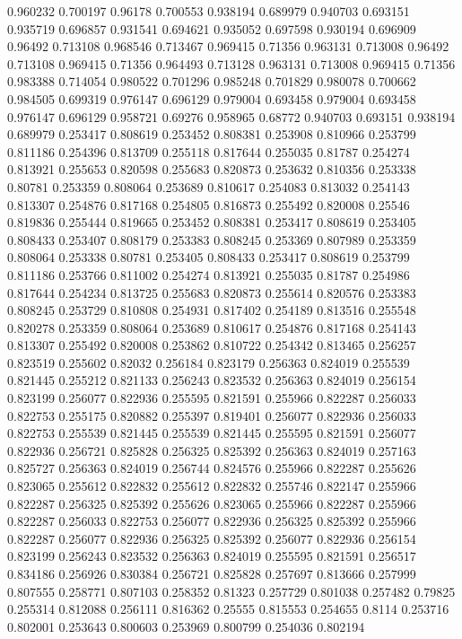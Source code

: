 0.960232 0.700197
0.96178 0.700553
0.938194 0.689979
0.940703 0.693151
0.935719 0.696857
0.931541 0.694621
0.935052 0.697598
0.930194 0.696909
0.96492 0.713108
0.968546 0.713467
0.969415 0.71356
0.963131 0.713008
0.96492 0.713108
0.969415 0.71356
0.964493 0.713128
0.963131 0.713008
0.969415 0.71356
0.983388 0.714054
0.980522 0.701296
0.985248 0.701829
0.980078 0.700662
0.984505 0.699319
0.976147 0.696129
0.979004 0.693458
0.979004 0.693458
0.976147 0.696129
0.958721 0.69276
0.958965 0.68772
0.940703 0.693151
0.938194 0.689979
0.253417 0.808619
0.253452 0.808381
0.253908 0.810966
0.253799 0.811186
0.254396 0.813709
0.255118 0.817644
0.255035 0.81787
0.254274 0.813921
0.255653 0.820598
0.255683 0.820873
0.253632 0.810356
0.253338 0.80781
0.253359 0.808064
0.253689 0.810617
0.254083 0.813032
0.254143 0.813307
0.254876 0.817168
0.254805 0.816873
0.255492 0.820008
0.25546 0.819836
0.255444 0.819665
0.253452 0.808381
0.253417 0.808619
0.253405 0.808433
0.253407 0.808179
0.253383 0.808245
0.253369 0.807989
0.253359 0.808064
0.253338 0.80781
0.253405 0.808433
0.253417 0.808619
0.253799 0.811186
0.253766 0.811002
0.254274 0.813921
0.255035 0.81787
0.254986 0.817644
0.254234 0.813725
0.255683 0.820873
0.255614 0.820576
0.253383 0.808245
0.253729 0.810808
0.254931 0.817402
0.254189 0.813516
0.255548 0.820278
0.253359 0.808064
0.253689 0.810617
0.254876 0.817168
0.254143 0.813307
0.255492 0.820008
0.253862 0.810722
0.254342 0.813465
0.256257 0.823519
0.255602 0.82032
0.256184 0.823179
0.256363 0.824019
0.255539 0.821445
0.255212 0.821133
0.256243 0.823532
0.256363 0.824019
0.256154 0.823199
0.256077 0.822936
0.255595 0.821591
0.255966 0.822287
0.256033 0.822753
0.255175 0.820882
0.255397 0.819401
0.256077 0.822936
0.256033 0.822753
0.255539 0.821445
0.255539 0.821445
0.255595 0.821591
0.256077 0.822936
0.256721 0.825828
0.256325 0.825392
0.256363 0.824019
0.257163 0.825727
0.256363 0.824019
0.256744 0.824576
0.255966 0.822287
0.255626 0.823065
0.255612 0.822832
0.255612 0.822832
0.255746 0.822147
0.255966 0.822287
0.256325 0.825392
0.255626 0.823065
0.255966 0.822287
0.255966 0.822287
0.256033 0.822753
0.256077 0.822936
0.256325 0.825392
0.255966 0.822287
0.256077 0.822936
0.256325 0.825392
0.256077 0.822936
0.256154 0.823199
0.256243 0.823532
0.256363 0.824019
0.255595 0.821591
0.256517 0.834186
0.256926 0.830384
0.256721 0.825828
0.257697 0.813666
0.257999 0.807555
0.258771 0.807103
0.258352 0.81323
0.257729 0.801038
0.257482 0.79825
0.255314 0.812088
0.256111 0.816362
0.25555 0.815553
0.254655 0.8114
0.253716 0.802001
0.253643 0.800603
0.253969 0.800799
0.254036 0.802194
